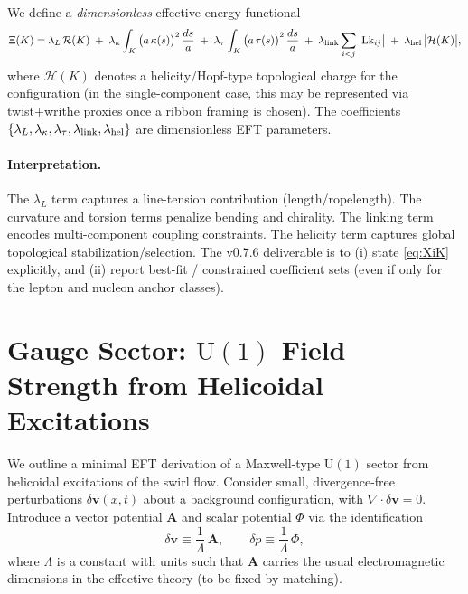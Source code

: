 \documentclass[10pt]{article}
\begin{document}
We define a \emph{dimensionless} effective energy functional
\begin{equation}
\Xi(K)=\lambda_L\,\mathcal{R}(K)
\;+\;\lambda_\kappa \int_K \big(a\,\kappa(s)\big)^2 \,\frac{ds}{a}
\;+\;\lambda_\tau \int_K \big(a\,\tau(s)\big)^2 \,\frac{ds}{a}
\;+\;\lambda_{\rm link}\sum_{i<j}\big|\mathrm{Lk}_{ij}\big|
\;+\;\lambda_{\rm hel}\,\big|\mathcal{H}(K)\big|,
\label{eq:XiK}
\end{equation}
where $\mathcal{H}(K)$ denotes a helicity/Hopf-type topological charge for the configuration (in the
single-component case, this may be represented via twist+writhe proxies once a ribbon framing is chosen).
The coefficients $\{\lambda_L,\lambda_\kappa,\lambda_\tau,\lambda_{\rm link},\lambda_{\rm hel}\}$ are
dimensionless EFT parameters.

\paragraph{Interpretation.}
The $\lambda_L$ term captures a line-tension contribution (length/ropelength). The curvature and torsion terms
penalize bending and chirality. The linking term encodes multi-component coupling constraints. The helicity term
captures global topological stabilization/selection. The v0.7.6 deliverable is to (i) state \eqref{eq:XiK} explicitly,
and (ii) report best-fit / constrained coefficient sets (even if only for the lepton and nucleon anchor classes).


\section{Gauge Sector: $\mathrm{U}(1)$ Field Strength from Helicoidal Excitations}
\label{sec:v076-u1}

We outline a minimal EFT derivation of a Maxwell-type $\mathrm{U}(1)$ sector from helicoidal excitations of the
swirl flow. Consider small, divergence-free perturbations $\delta\mathbf{v}(x,t)$ about a background configuration,
with $\nabla\cdot\delta\mathbf{v}=0$. Introduce a vector potential $\mathbf{A}$ and scalar potential $\Phi$ via the
identification
\begin{equation}
\delta\mathbf{v} \equiv \frac{1}{\Lambda}\,\mathbf{A},
\qquad
\delta p \equiv \frac{1}{\Lambda}\,\Phi,
\end{equation}
where $\Lambda$ is a constant with units such that $\mathbf{A}$ carries the usual electromagnetic dimensions in the
effective theory (to be fixed by matching).
\end{document}
